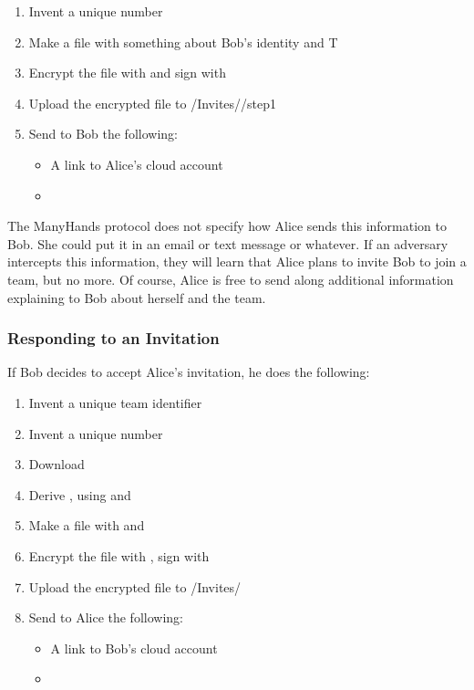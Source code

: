 \documentclass[pldi,10pt]{sigplanconf-pldi16}
\begin{document}
\begin{enumerate}
\item Invent a unique number 
\item Make a file with something about Bob's identity and T
\item Encrypt the file with  and sign with 
\item Upload the encrypted file to \slash Invites\slash {}\slash step1
\item Send to Bob the following:
  \begin{itemize}
  \item A link to Alice's cloud account
  \item {}
  \end{itemize}
\end{enumerate}

The ManyHands protocol does not specify how Alice sends this information to Bob.
She could put it in an email or text message or whatever.
If an adversary intercepts this information, they will learn that Alice plans to invite Bob to join a team, but no more.
Of course, Alice is free to send along additional information explaining to Bob about herself and the team.

\subsubsection{Responding to an Invitation}

If Bob decides to accept Alice's invitation, he does the following:

\begin{enumerate}
\item Invent a unique team identifier 
\item Invent a unique number 
\item Download 
\item Derive , using  and 
\item Make a file with  and 
\item Encrypt the file with , sign with 
\item Upload the encrypted file to \slash Invites\slash {}
\item Send to Alice the following:
  \begin{itemize}
  \item A link to Bob's cloud account
  \item {}
  \end{itemize}
\end{enumerate}
\end{document}
